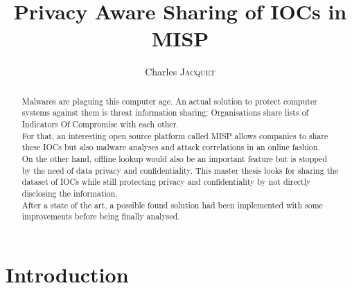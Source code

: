 \documentclass{eplmastersthesis}
\title{Privacy Aware Sharing of IOCs in MISP}	%
\author{Charles \textsc{Jacquet}}	%
\begin{document}
\maketitle					%
\thispagestyle{empty}		%


\begin{abstract} 
Malwares are plaguing this computer age. An actual solution to protect computer systems against them is threat information sharing: Organisations share lists of Indicators Of Compromise with each other.\\
For that, an interesting open source platform called MISP allows companies to share these IOCs but also malware analyses and attack correlations in an online fashion.\\
On the other hand, offline lookup would also be an important feature but is stopped by the need of data privacy and confidentiality. This master thesis looks for sharing the dataset of IOCs while still protecting privacy and confidentiality by not directly disclosing the information. \\
After a state of the art, a possible found solution had been implemented with  some improvements before being finally analysed.
\end{abstract}

\tableofcontents

\chapter{Introduction}
\end{document}
